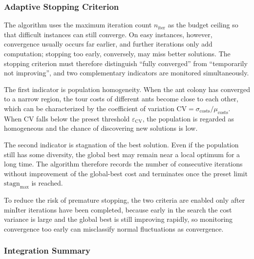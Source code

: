 \subsubsection{Adaptive Stopping Criterion}

The algorithm uses the maximum iteration count $n_{\mathrm{iter}}$ as the budget ceiling so that difficult instances can still converge. On easy instances, however, convergence usually occurs far earlier, and further iterations only add computation; stopping too early, conversely, may miss better solutions. The stopping criterion must therefore distinguish ``fully converged'' from ``temporarily not improving'', and two complementary indicators are monitored simultaneously.

The first indicator is population homogeneity. When the ant colony has converged to a narrow region, the tour costs of different ants become close to each other, which can be characterized by the coefficient of variation $\mathrm{CV} = \sigma_{\mathrm{costs}} / \mu_{\mathrm{costs}}$. When $\mathrm{CV}$ falls below the preset threshold $\varepsilon_{\mathrm{CV}}$, the population is regarded as homogeneous and the chance of discovering new solutions is low.

The second indicator is stagnation of the best solution. Even if the population still has some diversity, the global best may remain near a local optimum for a long time. The algorithm therefore records the number of consecutive iterations without improvement of the global-best cost and terminates once the preset limit $\mathrm{stagn}_{\max}$ is reached.

To reduce the risk of premature stopping, the two criteria are enabled only after $\mathrm{minIter}$ iterations have been completed, because early in the search the cost variance is large and the global best is still improving rapidly, so monitoring convergence too early can misclassify normal fluctuations as convergence.

\subsubsection{Integration Summary}

